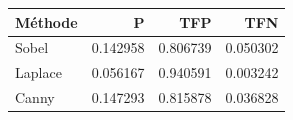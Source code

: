 \begin{tabular}{lrrr}
\toprule
Méthode & P & TFP & TFN\\
\midrule
Sobel & 0.142958 & 0.806739 & 0.050302\\
Laplace & 0.056167 & 0.940591 & 0.003242\\
Canny & 0.147293 & 0.815878 & 0.036828\\
\bottomrule
\end{tabular}
